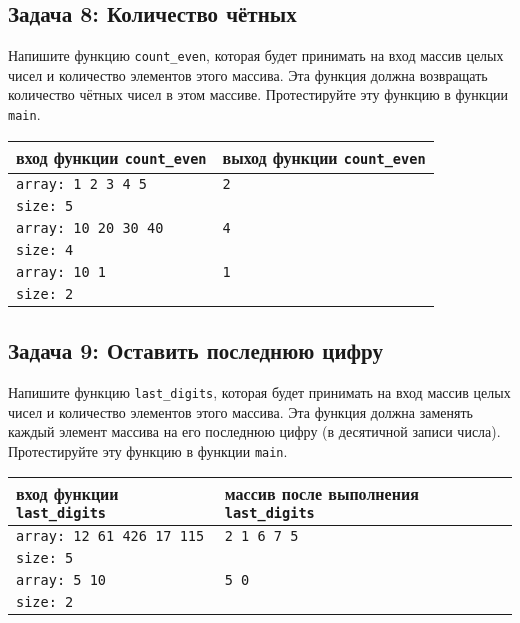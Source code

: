 \documentclass{article}
\begin{document}
 
\subsection*{Задача 8: Количество чётных}
Напишите функцию \texttt{count\_even}, которая будет принимать на вход массив целых чисел и количество элементов этого массива. Эта функция должна возвращать количество чётных чисел в этом массиве. Протестируйте эту функцию в функции \texttt{main}.
\begin{center}
\begin{tabular}{ l | l }
 вход функции \texttt{count\_even} & выход функции \texttt{count\_even} \\ \hline
 \texttt{array: 1 2 3 4 5} & \texttt{2} \\
 \texttt{size: 5} & \\ \hline
 \texttt{array: 10 20 30 40} & \texttt{4} \\
 \texttt{size: 4} & \\ \hline
 \texttt{array: 10 1} & \texttt{1} \\
 \texttt{size: 2} & \\
\end{tabular}
\end{center} 
 

\subsection*{Задача 9: Оставить последнюю цифру}
Напишите функцию \texttt{last\_digits}, которая будет принимать на вход массив целых чисел и количество элементов этого массива. Эта функция должна заменять каждый элемент массива на его последнюю цифру (в десятичной записи числа). Протестируйте эту функцию в функции \texttt{main}.

\begin{center}
\begin{tabular}{ l | l }
 вход функции \texttt{last\_digits} & массив после выполнения \texttt{last\_digits} \\ \hline
 \texttt{array: 12 61 426 17 115} & \texttt{2 1 6 7 5} \\
 \texttt{size: 5} & \\ \hline
 \texttt{array: 5 10} & \texttt{5 0} \\
 \texttt{size: 2} & \\
\end{tabular}
\end{center} 
\end{document}
